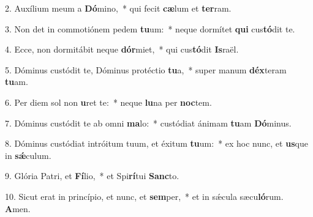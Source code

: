 2. Auxílium meum a \textbf{Dó}mino,~*  qui fecit \textbf{cæ}lum et \textbf{ter}ram.\

3. Non det in commotiónem pedem \textbf{tu}um:~*  neque dormítet \textbf{qui} cus\textbf{tó}dit te.\

4. Ecce, non dormitábit neque \textbf{dór}miet,~*  qui cus\textbf{tó}dit \textbf{Is}raël.\

5. Dóminus custódit te, Dóminus protéctio \textbf{tu}a,~*  super manum \textbf{déx}teram \textbf{tu}am.\

6. Per diem sol non \textbf{u}ret te:~*  neque \textbf{lu}na per \textbf{noc}tem.\

7. Dóminus custódit te ab omni \textbf{ma}lo:~*  custódiat ánimam \textbf{tu}am \textbf{Dó}minus.\

8. Dóminus custódiat intróitum tuum, et éxitum \textbf{tu}um:~*  ex hoc nunc, et \textbf{us}que in \textbf{sǽ}culum.\

9. Glória Patri, et \textbf{Fí}lio,~*  et Spi\textbf{rí}tui \textbf{Sanc}to.\

10. Sicut erat in princípio, et nunc, et \textbf{sem}per,~*  et in sǽcula sæcu\textbf{ló}rum. \textbf{A}men.\

